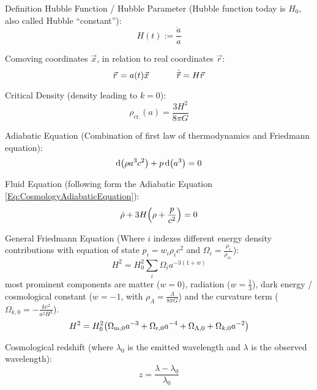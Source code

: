 			\noindent
			Definition Hubble Function / Hubble Parameter{} (Hubble function today is $H_0$, also called Hubble ``constant''):
			\begin{equation}
				H(t) := \frac{\dot{a}}{a}
			\end{equation}

			\noindent
			Comoving coordinates $\vec{x}$, in relation to real coordinates $\vec{r}$:
			\begin{equation}
				\vec{r} = a(t) \vec{x}
				\hsp
				\dot{\vec{r}} = H \vec{r}
			\end{equation}

			\noindent
			Critical Density (\ie density leading to $k=0$):
			\begin{equation}
				\rho_\text{cr.} (a) = \frac{3 H^2}{8 \pi G}
			\end{equation}

			\noindent
			Adiabatic Equation (Combination of first law of thermodynamics and Friedmann equation):
			\begin{equation}
				\label{Eq:CosmologyAdiabaticEquation}
				\dd \qty(\rho a^3 c^2) + p \dd (a^3) = 0
			\end{equation}

			\noindent
			Fluid Equation (following form the Adiabatic Equation \ref{Eq:CosmologyAdiabaticEquation}):
			\begin{equation}
				\dot{\rho} + 3 H \qty(\rho + \frac{p}{c^2}) = 0
			\end{equation}

			\noindent
			General Friedmann Equation (Where $i$ indexes different energy density contributions with equation of state $p_i = w_i \rho_i c^2$ and $\Omega_i = \frac{\rho_i}{\rho_\text{cr.}}$):
			\begin{equation}
				H^2 = H_0^2\sum_i \Omega_i a^{-3(1+w)}
			\end{equation}
			most prominent components are matter ($w=0$), radiation ($w=\frac{1}{3}$), dark energy / cosmological constant ($w=-1$, with $\rho_\Lambda = \frac{\Lambda}{8\pi G}$) and the curvature term ($\Omega_{k,0}=-\frac{k c^2}{a^2 H^2}$).
			\begin{equation}
				H^2 = H_0^2 \qty(\Omega_{\text{m},0} a^{-3} + \Omega_{\text{r},0} a^{-4} + \Omega_{\Lambda,0} + \Omega_{k,0} a^{-2})
			\end{equation}

			\noindent
			Cosmological redshift (where $\lambda_0$ is the emitted wavelength and $\lambda$ is the observed wavelength):
			\begin{equation}
				z = \frac{\lambda - \lambda_0}{\lambda_0}
			\end{equation}

